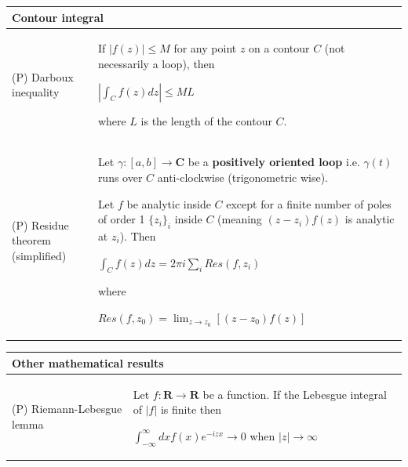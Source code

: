 \documentclass[11pt,amsmath,amssymb,latexsym]{article}
\newcommand{\toshTableBegin} 			{\begin{tabular}{|p{5cm}|p{11cm}|}}
\newcommand{\toshTableEnd} 				{\hline \end{tabular}}
\newcommand{\toshTableTitle}[1] 	{\hline \multicolumn{2}{|l|}{{\bf{#1}}}\\ \hline}
\newcommand{\toshProperty}[2]			{\hline (P) {#1} & {#2} \\}
\newcommand{\toshDef}[1]				{{\textbf{#1}}}
\newcommand{\toshC}							{{\mathbf{C}}}
\newcommand{\toshR}							{{\mathbf{R}}}
\begin{document}
\toshTableBegin
\toshTableTitle{Contour integral}
\toshProperty{Darboux inequality}{If $|f(z)|\leq M$ for any point $z$ on a contour $C$ (not necessarily a loop), then

\quad $\displaystyle \left|\int_C f(z) dz \right| \leq  M L$

\smallskip

where $L$ is the length of the contour $C$.
}
\toshProperty{Residue theorem (simplified)}{Let $\gamma: [a,b]\rightarrow\toshC$ be a \toshDef{positively oriented loop} i.e. $\gamma(t)$ runs over $C$ anti-clockwise (trigonometric wise).

Let $f$ be analytic inside $C$ except for a finite number of poles of order 1 $\{z_i\}_i$ inside $C$ (meaning $(z-z_i) f(z)$ is analytic at $z_i$). Then

\smallskip

\quad $\displaystyle \int_C f(z)dz = 2\pi i \sum_i Res(f,z_i)$

where 

\quad $\displaystyle Res(f,z_0) = \lim_{z\rightarrow z_0} \left[(z-z_0)f(z)\right]$
}
\toshTableEnd
\bigskip


\toshTableBegin
\toshTableTitle{Other mathematical results}
\toshProperty{Riemann-Lebesgue lemma}{Let $f:\toshR\rightarrow\toshR$ be a function. If the Lebesgue integral of $|f|$ is finite then

\quad $\displaystyle \int_{-\infty}^{\infty} d x f(x) e^{-iz x} \rightarrow 0$ when $|z|\rightarrow \infty$
}
\toshTableEnd
\bigskip



\end{document}
